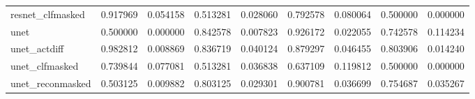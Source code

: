 \begin{tabular}{lrrrrrrrr}
resnet\_clfmasked &        0.917969 &            0.054158 &           0.513281 &               0.028060 &             0.792578 &                 0.080064 &              0.500000 &                  0.000000 \\
unet             &        0.500000 &            0.000000 &           0.842578 &               0.007823 &             0.926172 &                 0.022055 &              0.742578 &                  0.114234 \\
unet\_actdiff     &        0.982812 &            0.008869 &           0.836719 &               0.040124 &             0.879297 &                 0.046455 &              0.803906 &                  0.014240 \\
unet\_clfmasked   &        0.739844 &            0.077081 &           0.513281 &               0.036838 &             0.637109 &                 0.119812 &              0.500000 &                  0.000000 \\
unet\_reconmasked &        0.503125 &            0.009882 &           0.803125 &               0.029301 &             0.900781 &                 0.036699 &              0.754687 &                  0.035267 \\
\bottomrule
\end{tabular}

